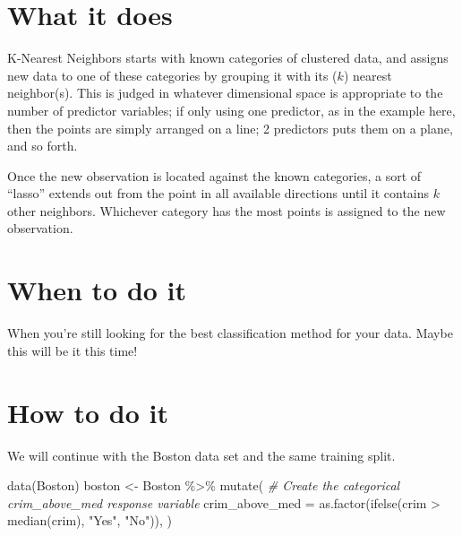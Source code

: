 \documentclass[
]{book}
\newenvironment{Shaded}{\begin{snugshade}}{\end{snugshade}}
\newcommand{\AttributeTok}[1]{\textcolor[rgb]{0.77,0.63,0.00}{#1}}
\newcommand{\CommentTok}[1]{\textcolor[rgb]{0.56,0.35,0.01}{\textit{#1}}}
\newcommand{\FunctionTok}[1]{\textcolor[rgb]{0.00,0.00,0.00}{#1}}
\newcommand{\NormalTok}[1]{#1}
\newcommand{\OtherTok}[1]{\textcolor[rgb]{0.56,0.35,0.01}{#1}}
\newcommand{\SpecialCharTok}[1]{\textcolor[rgb]{0.00,0.00,0.00}{#1}}
\newcommand{\StringTok}[1]{\textcolor[rgb]{0.31,0.60,0.02}{#1}}
\begin{document}
\hypertarget{what-it-does-6}{%
\section{What it does}\label{what-it-does-6}}

K-Nearest Neighbors starts with known categories of clustered data, and assigns new data to one of these categories by grouping it with its (\(k\)) nearest neighbor(s). This is judged in whatever dimensional space is appropriate to the number of predictor variables; if only using one predictor, as in the example here, then the points are simply arranged on a line; 2 predictors puts them on a plane, and so forth.

Once the new observation is located against the known categories, a sort of ``lasso'' extends out from the point in all available directions until it contains \(k\) other neighbors. Whichever category has the most points is assigned to the new observation.

\hypertarget{when-to-do-it-6}{%
\section{When to do it}\label{when-to-do-it-6}}

When you're still looking for the best classification method for your data. Maybe this will be it this time!

\hypertarget{how-to-do-it-6}{%
\section{How to do it}\label{how-to-do-it-6}}

We will continue with the Boston data set and the same training split.

\begin{Shaded}
\begin{Highlighting}[]
\FunctionTok{data}\NormalTok{(Boston)}
\NormalTok{boston }\OtherTok{\textless{}{-}}\NormalTok{ Boston }\SpecialCharTok{\%\textgreater{}\%}
  \FunctionTok{mutate}\NormalTok{(}
    \CommentTok{\# Create the categorical crim\_above\_med response variable}
    \AttributeTok{crim\_above\_med =} \FunctionTok{as.factor}\NormalTok{(}\FunctionTok{ifelse}\NormalTok{(crim }\SpecialCharTok{\textgreater{}} \FunctionTok{median}\NormalTok{(crim), }\StringTok{"Yes"}\NormalTok{, }\StringTok{"No"}\NormalTok{)),}
\NormalTok{  )}
\end{Highlighting}
\end{Shaded}
\end{document}
